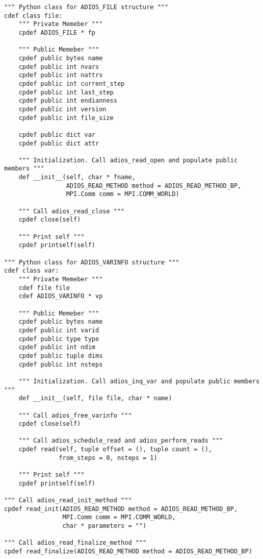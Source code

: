 \begin{lstlisting}[language=cython,caption={Read functions},label={},]
""" Python class for ADIOS_FILE structure """
cdef class file:
    """ Private Memeber """
    cpdef ADIOS_FILE * fp

    """ Public Memeber """
    cpdef public bytes name
    cpdef public int nvars
    cpdef public int nattrs
    cpdef public int current_step
    cpdef public int last_step
    cpdef public int endianness
    cpdef public int version
    cpdef public int file_size
    
    cpdef public dict var
    cpdef public dict attr
    
    """ Initialization. Call adios_read_open and populate public members """
    def __init__(self, char * fname, 
                 ADIOS_READ_METHOD method = ADIOS_READ_METHOD_BP, 
                 MPI.Comm comm = MPI.COMM_WORLD)
    
    """ Call adios_read_close """
    cpdef close(self)
        
    """ Print self """
    cpdef printself(self)

""" Python class for ADIOS_VARINFO structure """
cdef class var:
    """ Private Memeber """
    cdef file file
    cdef ADIOS_VARINFO * vp

    """ Public Memeber """
    cpdef public bytes name
    cpdef public int varid
    cpdef public type type
    cpdef public int ndim
    cpdef public tuple dims
    cpdef public int nsteps
    
    """ Initialization. Call adios_inq_var and populate public members """
    def __init__(self, file file, char * name)
        
    """ Call adios_free_varinfo """
    cpdef close(self)
        
    """ Call adios_schedule_read and adios_perform_reads """
    cpdef read(self, tuple offset = (), tuple count = (),
               from_steps = 0, nsteps = 1)

    """ Print self """
    cpdef printself(self)

""" Call adios_read_init_method """
cpdef read_init(ADIOS_READ_METHOD method = ADIOS_READ_METHOD_BP,
                MPI.Comm comm = MPI.COMM_WORLD,
                char * parameters = "")

""" Call adios_read_finalize_method """
cpdef read_finalize(ADIOS_READ_METHOD method = ADIOS_READ_METHOD_BP)

\end{lstlisting}

